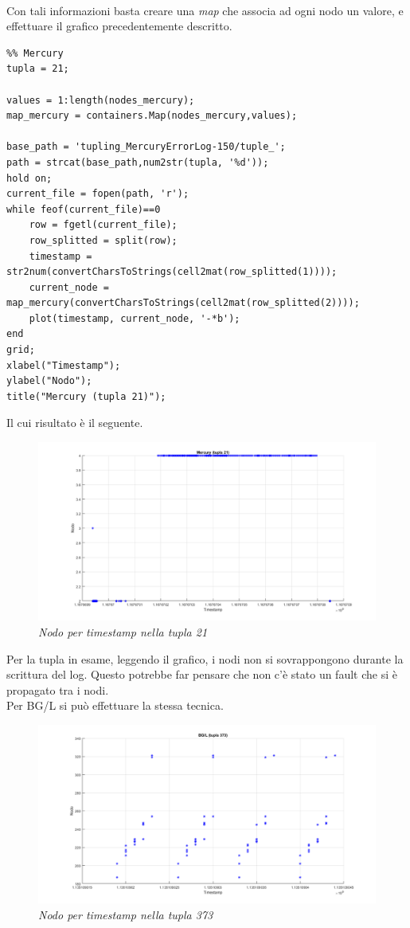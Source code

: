 \\Con tali informazioni basta creare una \textit{map} che associa ad ogni nodo un valore, e effettuare il grafico precedentemente descritto.
\begin{verbatim}
%% Mercury
tupla = 21;

values = 1:length(nodes_mercury);
map_mercury = containers.Map(nodes_mercury,values);

base_path = 'tupling_MercuryErrorLog-150/tuple_';
path = strcat(base_path,num2str(tupla, '%d'));
hold on;
current_file = fopen(path, 'r');
while feof(current_file)==0
	row = fgetl(current_file);
	row_splitted = split(row);
	timestamp = str2num(convertCharsToStrings(cell2mat(row_splitted(1))));
	current_node = map_mercury(convertCharsToStrings(cell2mat(row_splitted(2))));
	plot(timestamp, current_node, '-*b');
end
grid;
xlabel("Timestamp");
ylabel("Nodo");
title("Mercury (tupla 21)");
\end{verbatim}
Il cui risultato è il seguente.
\begin{figure}[H]
	\centering
	\includegraphics[width=\textwidth]{img/hw6/collisione_mercury.png}
	\caption{\textit{Nodo per timestamp nella tupla 21}}
\end{figure}
Per la tupla in esame, leggendo il grafico, i nodi non si sovrappongono durante la scrittura del log. Questo potrebbe far pensare che non c'è stato un fault che si è propagato tra i nodi.
\\Per BG/L si può effettuare la stessa tecnica.
\begin{figure}[H]
	\centering
	\includegraphics[width=\textwidth]{img/hw6/collisione_bgl.png}
	\caption{\textit{Nodo per timestamp nella tupla 373}}
\end{figure}

